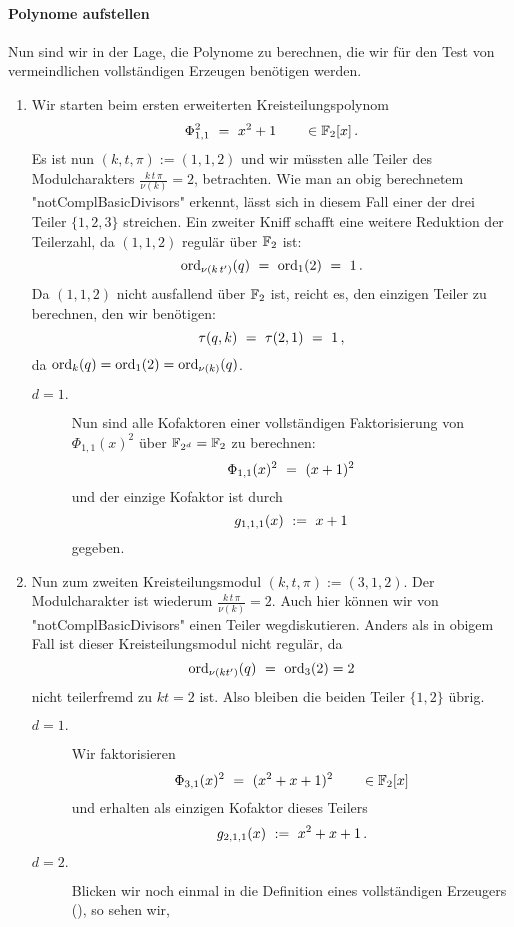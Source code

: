 \paragraph{Polynome aufstellen} Nun sind wir in der Lage, die Polynome zu
berechnen, die wir für den Test von vermeindlichen vollständigen Erzeugen
benötigen werden. 
\begin{enumerate}
  \item Wir starten beim ersten erweiterten Kreisteilungspolynom
    \[ \Phi_{1,1}^2 \ =\  x^2 + 1 \qquad \in \mathbb{F}_2[x]\,. \]
    Es ist nun $(k,t,\pi) := (1,1,2)$ und wir 
    müssten alle Teiler des Modulcharakters $\frac{k\,t\,\pi}{\nu(k)} = 2$,
    betrachten. Wie man an obig berechnetem "notComplBasicDivisors" erkennt, 
    lässt sich in diesem Fall einer der drei Teiler $\{1,2,3\}$
    streichen. Ein zweiter Kniff schafft eine weitere Reduktion der Teilerzahl, 
    da $(1,1,2)$ regulär über $\mathbb{F}_2$ ist:
    \[ \operatorname{ord}_{\nu(k\,t')}(q) \ =\  \operatorname{ord}_{1}(2) \ =\  1 \,. \]
    Da $(1,1,2)$ nicht ausfallend über $\mathbb{F}_2$ ist, reicht es, den einzigen
    Teiler zu berechnen, den wir benötigen:
    \[ \tau(q,k) \ =\  \tau(2,1) \ =\  1\,,\]
    da $\operatorname{ord}_k(q) = \operatorname{ord}_1(2) = \operatorname{ord}_{\nu(k)}(q)$.
    \begin{description}
      \item[$d=1.$] Nun sind alle Kofaktoren einer vollständigen Faktorisierung
        von $\Phi_{1,1}(x)^2$ über $\mathbb{F}_{2^d} = \mathbb{F}_2$ zu berechnen:
        \[ \Phi_{1,1}(x)^2 \ =\  (x+1)^2\]
        und der einzige Kofaktor ist durch
        \[ g_{1,1,1}(x) \ :=\  x+1 \]
        gegeben.
    \end{description}
  \item Nun zum zweiten Kreisteilungsmodul $(k,t,\pi) := (3,1,2)$. Der
    Modulcharakter ist wiederum $\frac{k\,t\,\pi}{\nu(k)} = 2$. Auch hier
    können wir von "notComplBasicDivisors" einen Teiler wegdiskutieren. Anders
    als in obigem Fall ist dieser Kreisteilungsmodul nicht regulär, da 
    \[ \operatorname{ord}_{\nu(kt')}(q) \ =\  \operatorname{ord}_3(2) = 2\]
    nicht teilerfremd zu $kt=2$ ist.
    Also bleiben die beiden Teiler $\{1,2\}$ übrig.
    \begin{description}
      \item[$d=1.$] Wir faktorisieren 
        \[ \Phi_{3,1}(x)^2 \ =\  (x^2+x+1)^2 \qquad \in \mathbb{F}_2[x] \]
        und erhalten als einzigen Kofaktor dieses Teilers
        \[ g_{2,1,1}(x) \ :=\  x^2+x+1\,.\]
      \item[$d=2.$] Blicken wir noch einmal in die Definition eines
        vollständigen Erzeugers (), so sehen wir,

\end{description}
\end{enumerate}
